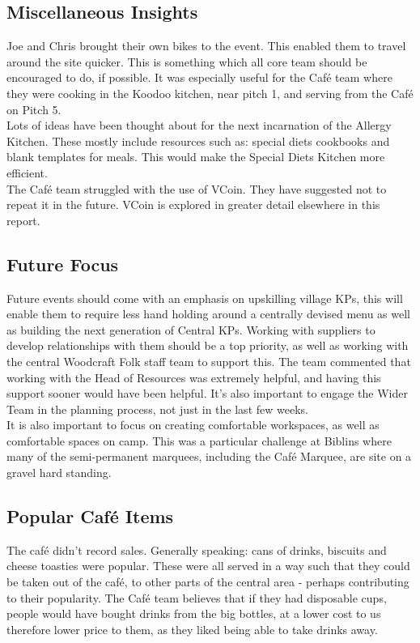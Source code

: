 \subsection{Miscellaneous Insights}
Joe and Chris brought their own bikes to the event. This enabled them to travel around the site quicker. This is something which all core team should be encouraged to do, if possible. It was especially useful for the Café team where they were cooking in the Koodoo kitchen, near pitch 1, and serving from the Café on Pitch 5. \\

Lots of ideas have been thought about for the next incarnation of the Allergy Kitchen. These mostly include resources such as: special diets cookbooks and blank templates for meals. This would make the Special Diets Kitchen more efficient. \\

The Café team struggled with the use of VCoin. They have suggested not to repeat it in the future. VCoin is explored in greater detail elsewhere in this report.
\subsection{Future Focus}
Future events should come with an emphasis on upskilling village KPs, this will enable them to require less hand holding around a centrally devised menu as well as building the next generation of Central KPs. Working with suppliers to develop relationships with them should be a top priority, as well as working with the central Woodcraft Folk staff team to support this. The team commented that working with the Head of Resources was extremely helpful, and having this support sooner would have been helpful. It's also important to engage the Wider Team in the planning process, not just in the last few weeks.\\

It is also important to focus on creating comfortable workspaces, as well as comfortable spaces on camp. This was a particular challenge at Biblins where many of the semi-permanent marquees, including the Café Marquee, are site on a gravel hard standing.

\subsection{Popular Café Items}
The café didn't record sales. Generally speaking: cans of drinks, biscuits and cheese toasties were popular. These were all served in a way such that they could be taken out of the café, to other parts of the central area - perhaps contributing to their popularity. The Café team believes that if they had disposable cups, people would have bought drinks from the big bottles, at a lower cost to us therefore lower price to them, as they liked being able to take drinks away.\\


